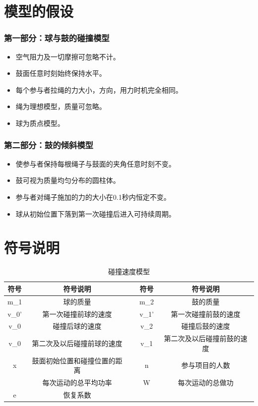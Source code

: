 \documentclass[withoutpreface,bwprint]{cumcmthesis}
\begin{document}
\section{模型的假设}
\subsubsection{第一部分：球与鼓的碰撞模型}
\begin{itemize}
	\item 空气阻力及一切摩擦可忽略不计。
	\item 鼓面任意时刻始终保持水平。
	\item 每个参与者拉绳的力大小，方向，用力时机完全相同。
	\item 绳为理想模型，质量可忽略。
	\item 球为质点模型。
\end{itemize}

\subsubsection{第二部分：鼓的倾斜模型}
\begin{itemize}
	\item 使参与者保持每根绳子与鼓面的夹角任意时刻不变。
	\item 鼓可视为质量均匀分布的圆柱体。
	\item 参与者对绳子施加的力的大小在0.1秒内恒定不变。
	\item 球从初始位置下落到第一次碰撞后进入可持续周期。
\end{itemize}

\section{符号说明}
\begin{table}[H]
	\centering
	\caption{碰撞速度模型}
	\begin{tabular}{ c c c c c}
	\hline
	 符号 & 符号说明 & & 符号 & 符号说明\\ 
	\hline
	 m_1 & 球的质量 &  & m_2 & 鼓的质量\\  
	 v_0' & 第一次碰撞前球的速度 & & v_1' & 第一次碰撞前鼓的速度\\ 
	 v_0 & 碰撞后球的速度 & & v_2 & 碰撞后鼓的速度\\
	 v_0 & 第二次及以后碰撞前球的速度 & & v_1 & 第二次及以后碰撞前鼓的速度\\
	 x & 鼓面初始位置和碰撞位置的距离 & & n & 参与项目的人数\\
	 \overline{P} & 每次运动的总平均功率 & & W & 每次运动的总做功\\
	 e & 恢复系数\\
	\hline
	\end{tabular}
\end{table}	
\end{document}
